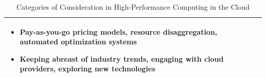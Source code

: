 \begin{table}[ht]
{\begin{tabularx}{\textwidth}{>{\raggedright\arraybackslash}p{4.5cm} >{\raggedright\arraybackslash}X >{\raggedright\arraybackslash}X}
    \begin{itemize}[label={\rule[0.1ex]{0.8ex}{0.8ex}}]
    \item Pay-as-you-go pricing models, resource disaggregation, automated optimization systems
    \item Keeping abreast of industry trends, engaging with cloud providers, exploring new technologies
    \end{itemize} \\
    \bottomrule
    \end{tabularx}
    }
    \caption{Categories of Consideration in High-Performance Computing in the Cloud}
    \label{tab:hpc_cloud_categories}

\end{table}



